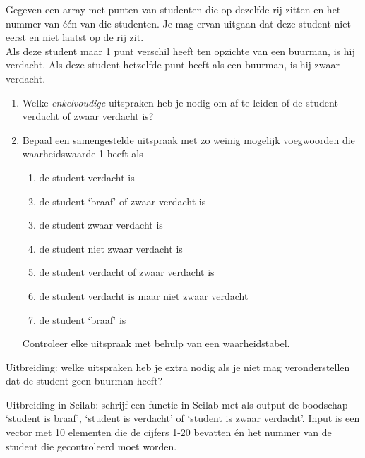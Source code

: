 \begin{oef}
Gegeven een array met punten van studenten die op dezelfde rij zitten en het nummer van \'e\'en van die studenten. Je mag ervan uitgaan dat deze student niet eerst en niet laatst op de rij zit.\\
Als deze student maar 1 punt verschil heeft ten opzichte van een buurman, is hij verdacht. Als deze student hetzelfde punt heeft als een buurman, is hij zwaar verdacht.
\begin{enumerate}
\item Welke \textit{enkelvoudige} uitspraken heb je nodig om af te leiden of de student verdacht of zwaar verdacht is?
\item Bepaal een samengestelde uitspraak met zo weinig mogelijk voegwoorden die waarheidswaarde 1 heeft als
\begin{enumerate}
\item de student verdacht is
\item de student ‘braaf’ of zwaar verdacht is
\item de student zwaar verdacht is
\item de student niet zwaar verdacht is
\item de student verdacht of zwaar verdacht is
\item de student verdacht is maar niet zwaar verdacht
\item de student `braaf' is
\end{enumerate}
Controleer elke uitspraak met behulp van een waarheidstabel.
\end{enumerate}

\noindent
Uitbreiding: welke uitspraken heb je extra nodig als je niet mag veronderstellen dat de student geen buurman heeft?

\noindent
Uitbreiding in Scilab: schrijf een functie in Scilab met als output de boodschap `student is braaf', `student is verdacht' of `student is zwaar verdacht'. Input is een vector met 10 elementen die de cijfers 1-20 bevatten \'en het nummer van de student die gecontroleerd moet worden.


\end{oef}
